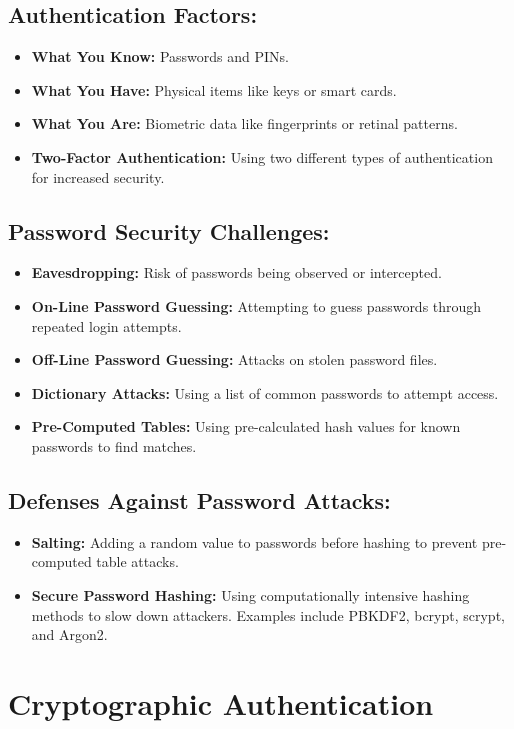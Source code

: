 \documentclass[12pt]{article}
\begin{document}
\subsection*{Authentication Factors:}
\begin{itemize}
    \item \textbf{What You Know:} Passwords and PINs.
    \item \textbf{What You Have:} Physical items like keys or smart cards.
    \item \textbf{What You Are:} Biometric data like fingerprints or retinal patterns.
    \item \textbf{Two-Factor Authentication:} Using two different types of authentication for increased security.
\end{itemize}

\subsection*{Password Security Challenges:}
\begin{itemize}
    \item \textbf{Eavesdropping:} Risk of passwords being observed or intercepted.
    \item \textbf{On-Line Password Guessing:} Attempting to guess passwords through repeated login attempts.
    \item \textbf{Off-Line Password Guessing:} Attacks on stolen password files.
    \item \textbf{Dictionary Attacks:} Using a list of common passwords to attempt access.
    \item \textbf{Pre-Computed Tables:} Using pre-calculated hash values for known passwords to find matches.
\end{itemize}

\subsection*{Defenses Against Password Attacks:}
\begin{itemize}
    \item \textbf{Salting:} Adding a random value to passwords before hashing to prevent pre-computed table attacks.
    \item \textbf{Secure Password Hashing:} Using computationally intensive hashing methods to slow down attackers. Examples include PBKDF2, bcrypt, scrypt, and Argon2.
\end{itemize}


\section*{Cryptographic Authentication}
\end{document}
